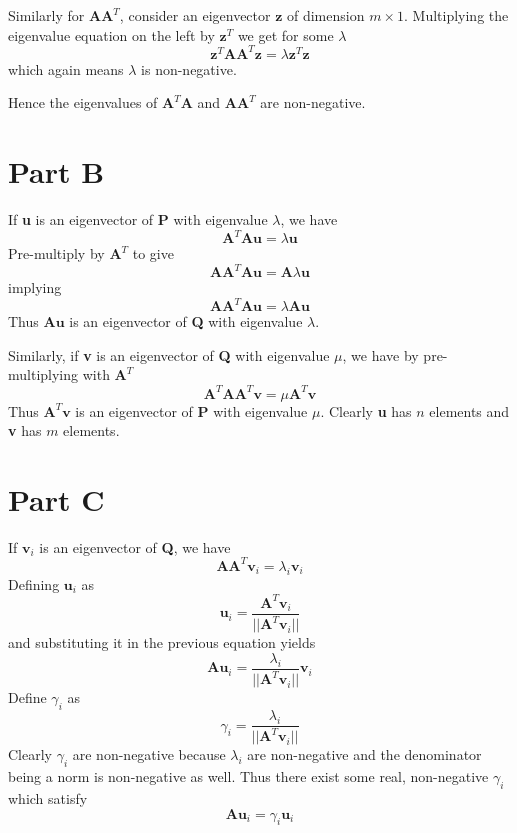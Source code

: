 \documentclass[10pt]{report}
\begin{document}
Similarly for $\textbf{A} \textbf{A}^T$, consider an eigenvector $\textbf{z}$ of dimension $m \times 1$. Multiplying the eigenvalue equation on the left by $\textbf{z}^T$ we get for some $\lambda$
$$\textbf{z}^T \textbf{A} \textbf{A}^T \textbf{z} = \lambda \textbf{z}^T \textbf{z}$$
which again means $\lambda$ is non-negative.

Hence the eigenvalues of $\textbf{A}^T \textbf{A}$ and $\textbf{A} \textbf{A}^T$ are non-negative.

\newpage
\section*{Part B}
If \textbf{u} is an eigenvector of \textbf{P} with eigenvalue $\lambda$, we have
$$\textbf{A}^T \textbf{A} \textbf{u} = \lambda \textbf{u}$$
Pre-multiply by $\textbf{A}^T$ to give
$$\textbf{A} \textbf{A}^T \textbf{A} \textbf{u} = \textbf{A} \lambda \textbf{u}$$
implying
$$\textbf{A} \textbf{A}^T \textbf{A} \textbf{u} = \lambda \textbf{A} \textbf{u}$$
Thus $\textbf{Au}$ is an eigenvector of \textbf{Q} with eigenvalue $\lambda$.

Similarly, if \textbf{v} is an eigenvector of \textbf{Q} with eigenvalue $\mu$, we have by pre-multiplying with $\textbf{A}^T$
$$\textbf{A}^T \textbf{A} \textbf{A}^T \textbf{v} = \mu \textbf{A}^T \textbf{v}$$
Thus $\textbf{A}^T \textbf{v}$ is an eigenvector of \textbf{P} with eigenvalue $\mu$.
\linebreak
Clearly \textbf{u} has $n$ elements and \textbf{v} has $m$ elements.

\section*{Part C}
If $\textbf{v}_i$ is an eigenvector of \textbf{Q}, we have
$$\textbf{AA}^T \textbf{v}_i = \lambda_i \textbf{v}_i$$
Defining $\textbf{u}_i$ as $$\textbf{u}_i = \frac{\textbf{A}^T \textbf{v}_i}{||\textbf{A}^T \textbf{v}_i||}$$ and substituting it in the previous equation yields
$$\textbf{Au}_i = \frac{\lambda_i}{||\textbf{A}^T \textbf{v}_i||} \textbf{v}_i$$
Define $\gamma_i$ as $$\gamma_i = \frac{\lambda_i}{||\textbf{A}^T \textbf{v}_i||}$$
Clearly $\gamma_i$ are non-negative because $\lambda_i$ are non-negative and the denominator being a norm is non-negative as well.
Thus there exist some real, non-negative $\gamma_i$ which satisfy
$$\textbf{Au}_i = \gamma_i \textbf{u}_i$$
\newpage
\end{document}
